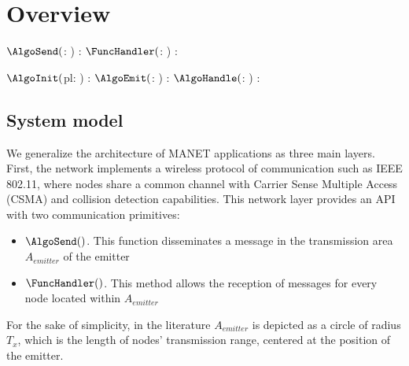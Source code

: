
\section{Overview}



\begin{algorithm}
	\footnotesize
	\DontPrintSemicolon
	
	$\AlgoSend   ($\Ms: \Msg) : \VoidType  {}
	$\FuncHandler($\Ms: \Msg) : \VoidType  {}

\caption{Network layer API}
\end{algorithm}


\begin{algorithm}
	\footnotesize
	\DontPrintSemicolon

	$\AlgoInit  ($pl: \MsgContent) : \Msg {}
	$\AlgoEmit  ($\Ms: \Msg) : \VoidType {}
	$\AlgoHandle($\Ms: \Msg) : \VoidType {}

\caption{Broadcast protocol API}
\end{algorithm}


\subsection{System model}


We generalize the architecture of MANET applications as three main layers.
%
First, the network implements a wireless protocol of communication such as IEEE 802.11, where nodes share a common channel with Carrier Sense Multiple Access (CSMA) and collision detection capabilities.
%
This network layer provides an API with two communication primitives:
\begin{itemize}
\item $\AlgoSend()$. This function disseminates a message in the transmission area $A_{emitter}$  of the emitter
\item $\FuncHandler()$. This method allows the reception of messages for every node located within $A_{emitter}$
\end{itemize}  
%
For the sake of simplicity, in the literature $A_{emitter}$ is depicted as a circle of radius $T_{x}$, which is the length of nodes' transmission range, centered at the position of the emitter.

